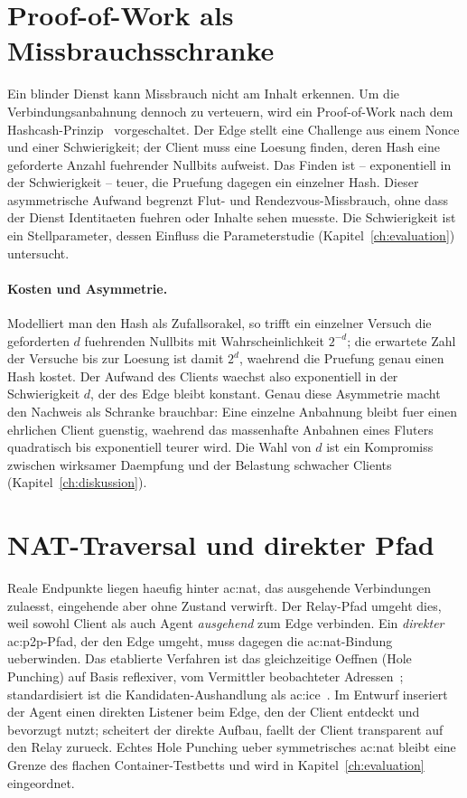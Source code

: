 \section{Proof-of-Work als Missbrauchsschranke}
\label{sec:pow}

Ein blinder Dienst kann Missbrauch nicht am Inhalt erkennen. Um die
Verbindungsanbahnung dennoch zu verteuern, wird ein Proof-of-Work nach dem
Hashcash-Prinzip~\cite{back2002hashcash} vorgeschaltet. Der Edge stellt eine
Challenge aus einem Nonce und einer Schwierigkeit; der Client muss eine Loesung
finden, deren Hash eine geforderte Anzahl fuehrender Nullbits aufweist. Das
Finden ist -- exponentiell in der Schwierigkeit -- teuer, die Pruefung dagegen
ein einzelner Hash. Dieser asymmetrische Aufwand begrenzt Flut- und
Rendezvous-Missbrauch, ohne dass der Dienst Identitaeten fuehren oder Inhalte
sehen muesste. Die Schwierigkeit ist ein Stellparameter, dessen Einfluss die
Parameterstudie (Kapitel~\ref{ch:evaluation}) untersucht.

\paragraph{Kosten und Asymmetrie.} Modelliert man den Hash als Zufallsorakel, so
trifft ein einzelner Versuch die geforderten $d$ fuehrenden Nullbits mit
Wahrscheinlichkeit $2^{-d}$; die erwartete Zahl der Versuche bis zur Loesung ist
damit $2^{d}$, waehrend die Pruefung genau einen Hash kostet. Der Aufwand des
Clients waechst also exponentiell in der Schwierigkeit $d$, der des Edge bleibt
konstant. Genau diese Asymmetrie macht den Nachweis als Schranke brauchbar: Eine
einzelne Anbahnung bleibt fuer einen ehrlichen Client guenstig, waehrend das
massenhafte Anbahnen eines Fluters quadratisch bis exponentiell teurer wird. Die
Wahl von $d$ ist ein Kompromiss zwischen wirksamer Daempfung und der Belastung
schwacher Clients (Kapitel~\ref{ch:diskussion}).

\section{NAT-Traversal und direkter Pfad}
\label{sec:nat}

Reale Endpunkte liegen haeufig hinter \gls{ac:nat}, das ausgehende Verbindungen
zulaesst, eingehende aber ohne Zustand verwirft. Der Relay-Pfad umgeht dies, weil
sowohl Client als auch Agent \emph{ausgehend} zum Edge verbinden. Ein
\emph{direkter} \gls{ac:p2p}-Pfad, der den Edge umgeht, muss dagegen die
\gls{ac:nat}-Bindung ueberwinden. Das etablierte Verfahren ist das
gleichzeitige Oeffnen (Hole Punching) auf Basis reflexiver, vom Vermittler
beobachteter Adressen~\cite{ford2005peer}; standardisiert ist die
Kandidaten-Aushandlung als \gls{ac:ice}~\cite{rfc8445}. Im Entwurf inseriert der
Agent einen direkten Listener beim Edge, den der Client entdeckt und bevorzugt
nutzt; scheitert der direkte Aufbau, faellt der Client transparent auf den Relay
zurueck. Echtes Hole Punching ueber symmetrisches \gls{ac:nat} bleibt eine
Grenze des flachen Container-Testbetts und wird in
Kapitel~\ref{ch:evaluation} eingeordnet.

